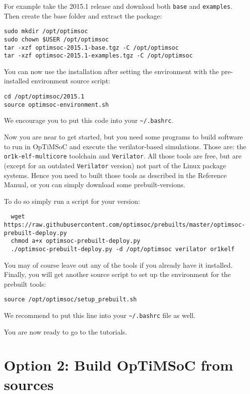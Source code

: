 For example take the 2015.1 release and download both \verb|base| and
\verb|examples|. Then create the base folder and extract the package:

\begin{lstlisting}
sudo mkdir /opt/optimsoc
sudo chown $USER /opt/optimsoc
tar -xzf optimsoc-2015.1-base.tgz -C /opt/optimsoc
tar -xzf optimsoc-2015.1-examples.tgz -C /opt/optimsoc
\end{lstlisting}

You can now use the installation after setting the environment with
the pre-installed environment source script:

\begin{lstlisting}
cd /opt/optimsoc/2015.1
source optimsoc-environment.sh
\end{lstlisting}

We encourage you to put this code into your \verb|~/.bashrc|.

Now you are near to get started, but you need some programs to build
software to run in OpTiMSoC and execute the verilator-based
simulations. Those are: the \verb|or1k-elf-multicore| toolchain and
\verb|Verilator|. All those tools are free, but are (except for an
outdated \verb|Verilator| version) not part of the Linux package
systems. Hence you need to built those tools as described in the
Reference Manual, or you can simply download some prebuilt-versions.

To do so simply run a script for your version:

\begin{lstlisting}
  wget https://raw.githubusercontent.com/optimsoc/prebuilts/master/optimsoc-prebuilt-deploy.py
  chmod a+x optimsoc-prebuilt-deploy.py
  ./optimsoc-prebuilt-deploy.py -d /opt/optimsoc verilator or1kelf
\end{lstlisting}

You may of course leave out any of the tools if you already have it
installed. Finally, you will get another source script to set up the
environment for the prebuilt tools:

\begin{lstlisting}
source /opt/optimsoc/setup_prebuilt.sh
\end{lstlisting}

We recommend to put this line into your \verb|~/.bashrc| file as well.

You are now ready to go to the tutorials.

\section{Option 2: Build OpTiMSoC from sources}

